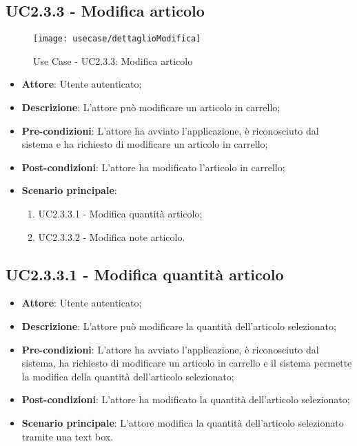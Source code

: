 \newpage

\subsection{UC2.3.3 - Modifica articolo}

\begin{figure}[!h] 
    \centering 
    \texttt{[image: usecase/dettaglioModifica]} 
    \caption{Use Case - UC2.3.3: Modifica articolo}
\end{figure}

\begin{itemize}
	\item \textbf{Attore}: Utente autenticato;
	\item \textbf{Descrizione}: L'attore può modificare un articolo in carrello;
	\item \textbf{Pre-condizioni}: L'attore ha avviato l'applicazione, è riconosciuto dal sistema e ha richiesto di modificare un articolo in carrello;
	\item \textbf{Post-condizioni}: L'attore ha modificato l'articolo in carrello;
	\item \textbf{Scenario principale}:
		\begin{enumerate}
			\item UC2.3.3.1 - Modifica quantità articolo;
			\item UC2.3.3.2 - Modifica note articolo.
		\end{enumerate}
\end{itemize}

\subsection{UC2.3.3.1 - Modifica quantità articolo}

\begin{itemize}
	\item \textbf{Attore}: Utente autenticato;
	\item \textbf{Descrizione}: L'attore può modificare la quantità dell'articolo selezionato;
	\item \textbf{Pre-condizioni}: L'attore ha avviato l'applicazione, è riconosciuto dal sistema, ha richiesto di modificare un articolo in carrello e il sistema permette la modifica della quantità dell'articolo selezionato;
	\item \textbf{Post-condizioni}: L'attore ha modificato la quantità dell'articolo selezionato;
	\item \textbf{Scenario principale}: L'attore modifica la quantità dell'articolo selezionato tramite una text box.
\end{itemize}

